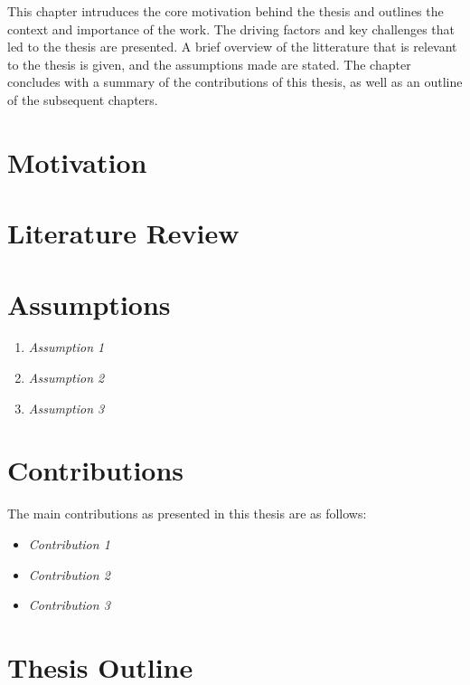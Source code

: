 This chapter intruduces the core motivation behind the thesis and outlines the
context and importance of the work. The driving factors and key challenges that
led to the thesis are presented. A brief overview of the litterature that is
relevant to the thesis is given, and the assumptions made are
stated. The chapter concludes with a summary of the contributions of this thesis,
as well as an outline of the subsequent chapters.


\section{Motivation}

\section{Literature Review}

\section{Assumptions}
\begin{enumerate}
    \item \emph{Assumption 1}
    \item \emph{Assumption 2}
    \item \emph{Assumption 3}
\end{enumerate}

\section{Contributions}

The main contributions as presented in this thesis are as follows:
\begin{itemize}
    \item \emph{Contribution 1}
    \item \emph{Contribution 2}
    \item \emph{Contribution 3}
\end{itemize}

\section{Thesis Outline}
